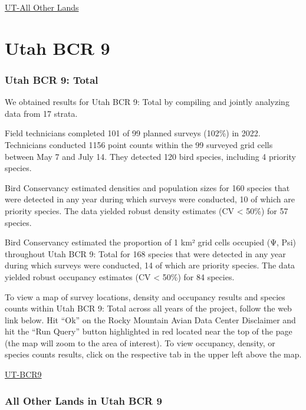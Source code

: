 \documentclass[
  letterpaper,
  DIV=11,
  numbers=noendperiod,
  oneside]{scrreprt}
\begin{document}
\href{http://www.rmbo.org/new_site/adc/QueryWindow.aspx\#N4IgzgrgDgpgTmALnAhoiBbEAuABCAVQBUBaAQQBsLcB5RAC3lwBkUA7AEzBAF8g}{UT-All
Other Lands}

\hypertarget{utah-bcr-9}{%
\section{Utah BCR 9}\label{utah-bcr-9}}

\hypertarget{utah-bcr-9-total}{%
\subsubsection{Utah BCR 9: Total}\label{utah-bcr-9-total}}

We obtained results for Utah BCR 9: Total by compiling and jointly
analyzing data from 17 strata.

Field technicians completed 101 of 99 planned surveys (102\%) in 2022.
Technicians conducted 1156 point counts within the 99 surveyed grid
cells between May 7 and July 14. They detected 120 bird species,
including 4 priority species.

Bird Conservancy estimated densities and population sizes for 160
species that were detected in any year during which surveys were
conducted, 10 of which are priority species. The data yielded robust
density estimates (CV \textless{} 50\%) for 57 species.

Bird Conservancy estimated the proportion of 1 km² grid cells occupied
(Ψ, Psi) throughout Utah BCR 9: Total for 168 species that were detected
in any year during which surveys were conducted, 14 of which are
priority species. The data yielded robust occupancy estimates (CV
\textless{} 50\%) for 84 species.

To view a map of survey locations, density and occupancy results and
species counts within Utah BCR 9: Total across all years of the project,
follow the web link below. Hit ``Ok'' on the Rocky Mountain Avian Data
Center Disclaimer and hit the ``Run Query'' button highlighted in red
located near the top of the page (the map will zoom to the area of
interest). To view occupancy, density, or species counts results, click
on the respective tab in the upper left above the map.

\href{http://www.rmbo.org/new_site/adc/QueryWindow.aspx\#N4IgzgrgDgpgTmALnAhoiBbEAuABCAVQBUBaAIQGEAlAThAF8g==}{UT-BCR9}

\hypertarget{all-other-lands-in-utah-bcr-9}{%
\subsubsection{All Other Lands in Utah BCR
9}\label{all-other-lands-in-utah-bcr-9}}
\end{document}
